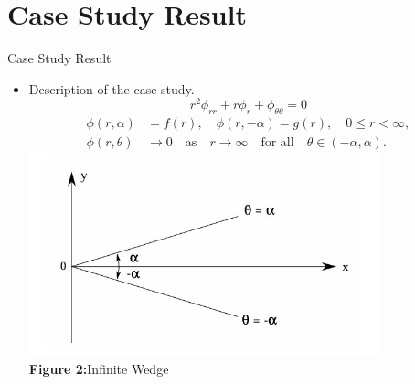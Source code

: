 \documentclass{beamer}
\begin{document}
\section{Case Study Result}
\begin{frame}{Case Study Result}
    \begin{itemize}
        \item Description of the case study.\\[0.2cm]
        \begin{equation}
            r^2 \phi_{rr} + r \phi_r + \phi_{\theta\theta} = 0
        \end{equation}
        \begin{align}
            \phi(r, \alpha) &= f(r), \quad \phi(r, -\alpha) = g(r), \quad 0 \leq r < \infty, \\
            \phi(r, \theta) &\to 0 \quad \text{as} \quad r \to \infty \quad \text{for all} \quad \theta \in (-\alpha, \alpha).
        \end{align}
        \vfill %
        \centering
        \includegraphics[width=0.8\textwidth,height=0.35\textheight]{infinite_wedge.jpg} %
        \\[0.2cm] %
        {\small \textbf {Figure 2:}Infinite Wedge} %
    \end{itemize}
\end{frame}
\end{document}
